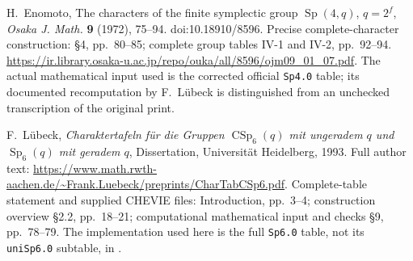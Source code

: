 H.~Enomoto,
The characters of the finite symplectic group $\operatorname{Sp}(4,q)$,
$q=2^f$,
\emph{Osaka J. Math.} \textbf{9} (1972), 75--94.
doi:10.18910/8596.
Precise complete-character construction: \S4, pp.~80--85;
complete group tables IV-1 and IV-2, pp.~92--94.
\url{https://ir.library.osaka-u.ac.jp/repo/ouka/all/8596/ojm09_01_07.pdf}.
The actual mathematical input used is the corrected official
\texttt{Sp4.0} table; its documented recomputation by F.~L\"ubeck
is distinguished from an unchecked transcription of the original print.

F.~L\"ubeck,
\emph{Charaktertafeln f\"ur die Gruppen $\operatorname{CSp}_6(q)$
mit ungeradem $q$ und $\operatorname{Sp}_6(q)$ mit geradem $q$},
Dissertation, Universit\"at Heidelberg, 1993.
Full author text:
\url{https://www.math.rwth-aachen.de/~Frank.Luebeck/preprints/CharTabCSp6.pdf}.
Complete-table statement and supplied CHEVIE files: Introduction,
pp.~3--4; construction overview \S2.2, pp.~18--21;
computational mathematical input and checks \S9, pp.~78--79.
The implementation used here is the full \texttt{Sp6.0} table,
not its \texttt{uniSp6.0} subtable, in \cite{G2T:GCT}.
